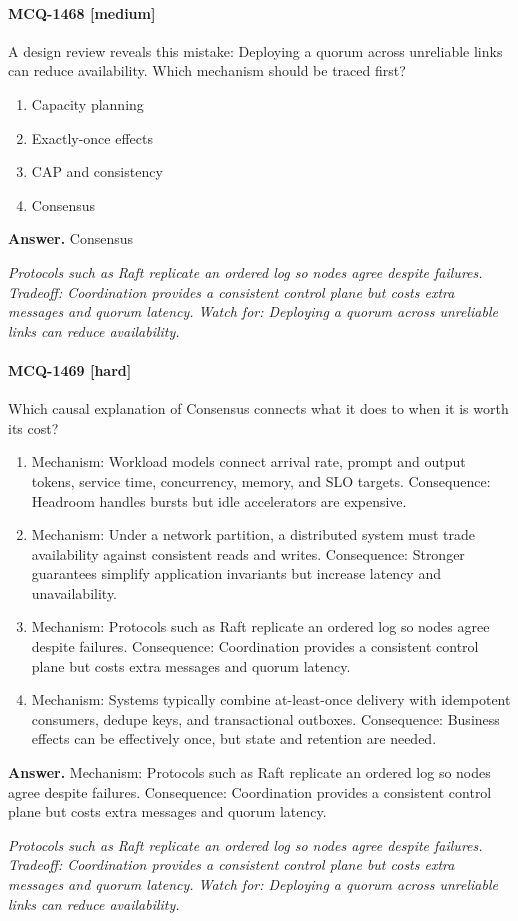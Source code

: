 \paragraph{MCQ-1468 [medium]} A design review reveals this mistake: Deploying a quorum across unreliable links can reduce availability. Which mechanism should be traced first?
\begin{enumerate}[label=\Alph*.]
\item Capacity planning
\item Exactly-once effects
\item CAP and consistency
\item Consensus
\end{enumerate}
\noindent\textbf{Answer.} Consensus
\par\textit{Protocols such as Raft replicate an ordered log so nodes agree despite failures. Tradeoff: Coordination provides a consistent control plane but costs extra messages and quorum latency. Watch for: Deploying a quorum across unreliable links can reduce availability.}
\paragraph{MCQ-1469 [hard]} Which causal explanation of Consensus connects what it does to when it is worth its cost?
\begin{enumerate}[label=\Alph*.]
\item Mechanism: Workload models connect arrival rate, prompt and output tokens, service time, concurrency, memory, and SLO targets. Consequence: Headroom handles bursts but idle accelerators are expensive.
\item Mechanism: Under a network partition, a distributed system must trade availability against consistent reads and writes. Consequence: Stronger guarantees simplify application invariants but increase latency and unavailability.
\item Mechanism: Protocols such as Raft replicate an ordered log so nodes agree despite failures. Consequence: Coordination provides a consistent control plane but costs extra messages and quorum latency.
\item Mechanism: Systems typically combine at-least-once delivery with idempotent consumers, dedupe keys, and transactional outboxes. Consequence: Business effects can be effectively once, but state and retention are needed.
\end{enumerate}
\noindent\textbf{Answer.} Mechanism: Protocols such as Raft replicate an ordered log so nodes agree despite failures. Consequence: Coordination provides a consistent control plane but costs extra messages and quorum latency.
\par\textit{Protocols such as Raft replicate an ordered log so nodes agree despite failures. Tradeoff: Coordination provides a consistent control plane but costs extra messages and quorum latency. Watch for: Deploying a quorum across unreliable links can reduce availability.}
